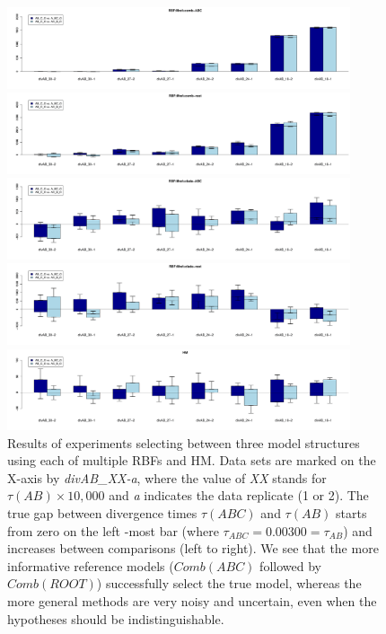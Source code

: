 \documentclass[11pt]{article}
\newcommand{\1}{\mathbbm{1}}
\begin{document}
\begin{figure}[H]

\includegraphics[width=0.9\textwidth]{results/results-M4-divAB/M4-divAB-results-comb_ABC}

\includegraphics[width=0.9\textwidth]{results/results-M4-divAB/M4-divAB-results-comb_ROOT}

\includegraphics[width=0.9\textwidth]{results/results-M4-divAB/M4-divAB-results-clade_ABC}

\includegraphics[width=0.9\textwidth]{results/results-M4-divAB/M4-divAB-results-clade_ROOT}

\includegraphics[width=0.9\textwidth]{results/results-M4-divAB/M4-divAB-results-HM}

\captionsetup{width=0.8\textwidth}
\caption{ 
Results of experiments selecting between three model structures using each of multiple RBFs and HM.
%
Data sets are marked on the X-axis by \textit{divAB\_XX-a}, where the value of \textit{XX} stands for $\tau(AB) \times 10,000$ and \textit{a} indicates the data replicate (1 or 2).
%
The true gap between divergence times $\tau(ABC)$ and $\tau(AB)$ starts from zero on the left -most bar (where $\tau_{ABC} = 0.00300 = \tau_{AB}$) and increases between comparisons (left to right).
%
We see that the more informative reference models ($Comb(ABC)$ followed by $Comb(ROOT)$) successfully select the true model, whereas the  more general methods are very noisy and uncertain, even when the hypotheses should be indistinguishable.}
\label{fig:results-M4-divAB}
\end{figure}
\end{document}

